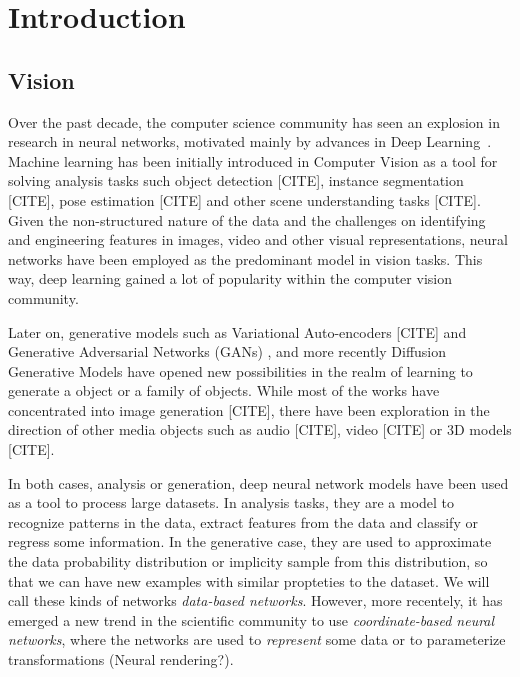 \chapter{Introduction}


\section{Vision}

Over the past decade, the computer science community has seen an explosion in research in neural networks, motivated mainly by advances in Deep Learning~\cite{lecun2015deep,goodfellow2016deep}. Machine learning has been initially introduced in Computer Vision as a tool for solving analysis tasks such object detection [CITE], instance segmentation [CITE], pose estimation [CITE] and other scene understanding tasks [CITE]. Given the non-structured nature of the data and the challenges on identifying and engineering features in images, video and other visual representations, neural networks have been employed as the predominant model in vision tasks. This way, deep learning gained a lot of popularity within the computer vision community.

Later on, generative models such as Variational Auto-encoders [CITE] and Generative Adversarial Networks (GANs) \cite{goodfellow2014generative}, and more recently Diffusion Generative Models \cite{ho2020denoising} have opened new possibilities in the realm of learning to generate a object or a family of objects. While most of the works have concentrated into image generation [CITE], there have been exploration in the direction of other media objects such as audio [CITE], video [CITE] or 3D models [CITE].

In both cases, analysis or generation, deep neural network models have been used as a tool to process large datasets. In analysis tasks, they are a model to recognize patterns in the data, extract features from the data and classify or regress some information. In the generative case, they are used to approximate the data probability distribution or implicity sample from this distribution, so that we can have new examples with similar propteties to the dataset. We will call these kinds of networks \textit{data-based networks}. However, more recentely, it has emerged a new trend in the scientific community to use \textit{coordinate-based neural networks}, where the networks are used to \textit{represent} some data or to parameterize transformations (Neural rendering?).

